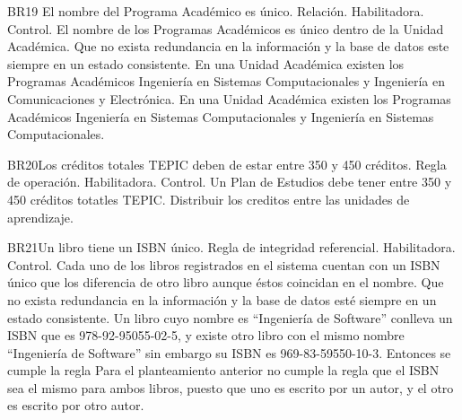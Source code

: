 \begin{BussinesRule}{BR19} {El nombre del Programa Académico es único.}
    \BRitem[Tipo: ]Relación.
    \BRitem[Clase: ]Habilitadora.
    \BRitem[Nivel: ]Control.
    \BRitem[Descripción: ]El nombre de los Programas Académicos es único dentro de la Unidad Académica.
    \BRitem[Motivación: ] Que no exista redundancia en la información y la base de datos este siempre en un estado consistente.
     En una Unidad Académica existen los Programas Académicos Ingeniería en Sistemas Computacionales y Ingeniería en Comunicaciones y Electrónica.
    En una Unidad Académica existen los Programas Académicos Ingeniería en Sistemas Computacionales y Ingeniería en Sistemas Computacionales.
\end{BussinesRule}
 \begin{BussinesRule}{BR20}{Los créditos totales TEPIC deben de estar entre 350 y 450 créditos.}
     \BRitem[Tipo: ]Regla de operación.
     \BRitem[Clase: ]Habilitadora.
     \BRitem[Nivel: ]Control.
     \BRitem[Descripción: ]Un Plan de Estudios debe tener entre 350 y 450 créditos totatles TEPIC.
     \BRitem[Motivación:] Distribuir los creditos entre las unidades de aprendizaje.
 \end{BussinesRule}
\begin{BussinesRule}{BR21}{Un libro tiene un ISBN único.}
    \BRitem[Tipo:] Regla de integridad referencial.
    \BRitem[Clase:] Habilitadora.
    \BRitem[Nivel:] Control.
    \BRitem[Descripción:] Cada uno de los libros registrados en el sistema cuentan con un ISBN único que los diferencia de otro libro aunque éstos coincidan en el nombre.
    \BRitem[Motivación:] Que no exista redundancia en la información y la base de datos esté siempre en un estado consistente.
     Un libro cuyo nombre es ``Ingeniería de Software'' conlleva un ISBN que es 978-92-95055-02-5, y existe otro libro con el mismo nombre ``Ingeniería de Software'' sin embargo su ISBN es 969-83-59550-10-3. Entonces se cumple la regla
     Para el planteamiento anterior no cumple la regla que el ISBN sea el mismo para ambos libros, puesto que uno es escrito por un autor, y el otro es escrito por otro autor.
\end{BussinesRule}
